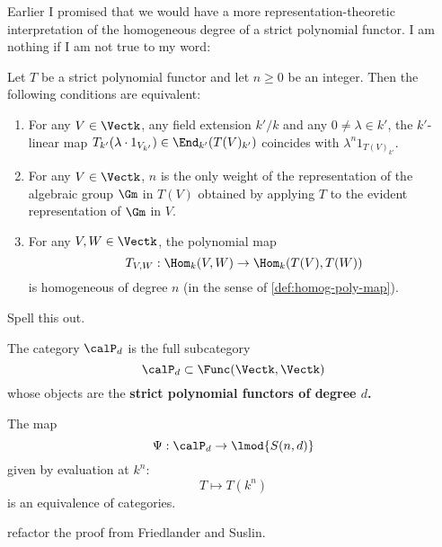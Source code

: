 \documentclass[12pt]{article}
\begin{document}
Earlier I promised that we would have a more representation-theoretic interpretation of the homogeneous degree 
of a strict polynomial functor. I am nothing if I am not true to my word:
\begin{lem}
	Let $T$ be a strict polynomial functor and let $n\ge 0$ be an integer. Then the following conditions are equivalent:
	\begin{enumerate}
		\item For any $V\in\Vectk$, any field extension $k'/k$ and any $0\ne\lambda\in k'$, the $k'$-linear 
		map $T_{k'}(\lambda\cdot 1_{V_{k'}})\in\End_{k'}(T(V)_{k'})$ coincides with $\lambda^n1_{T(V)_{k'}}$.
		\item For any $V\in\Vectk$, $n$ is the only weight of the representation of the algebraic group $\Gm$ in $T(V)$
		obtained by applying $T$ to the evident representation of $\Gm$ in $V$.
		\item For any $V,W\in\Vectk$, the polynomial map 
		\[T_{V,W}:\Hom_k(V,W)\to \Hom_k(T(V),T(W))\] 
		is homogeneous of degree $n$ (in the sense of \ref{def:homog-poly-map}).
	\end{enumerate}
\end{lem}
\begin{prf}
	\color{red} Spell this out. 
\end{prf}

\begin{defn}
	The category $\calP_d$ is the full subcategory 
	\[\calP_d\subset\Func(\Vectk,\Vectk)\]
	whose objects are the \textbf{strict polynomial functors of degree $d$.}
\end{defn}

\begin{thm}
	The map
	\[\Psi:\calP_d\to \lmod {S(n,d)}\]
	given by evaluation at $k^n$:
	\[T\mapsto T(k^n)\]
	is an equivalence of categories.
\end{thm}
\begin{prf}
	\color{red} refactor the proof from Friedlander and Suslin.
\end{prf}
\end{document}
